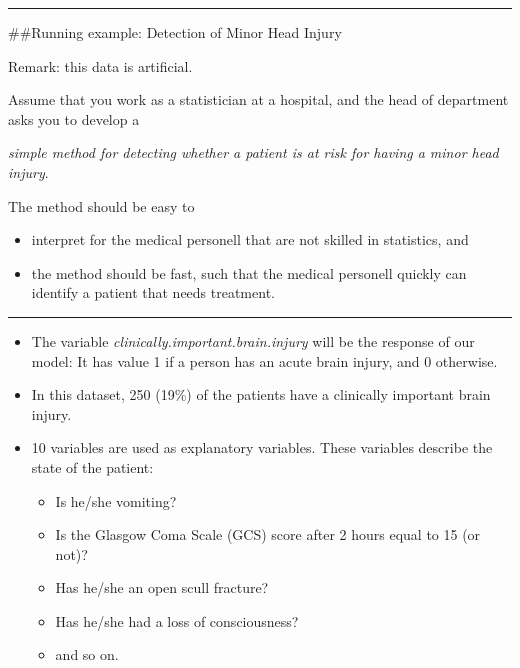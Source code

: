 \documentclass[]{article}
\providecommand{\tightlist}{%
  \setlength{\itemsep}{0pt}\setlength{\parskip}{0pt}}
\begin{document}
\begin{center}\rule{0.5\linewidth}{\linethickness}\end{center}

\#\#Running example: Detection of Minor Head Injury

Remark: this data is artificial.

Assume that you work as a statistician at a hospital, and the head of
department asks you to develop a

\emph{simple method for detecting whether a patient is at risk for
having a minor head injury}.

The method should be easy to

\begin{itemize}
\tightlist
\item
  interpret for the medical personell that are not skilled in
  statistics, and
\item
  the method should be fast, such that the medical personell quickly can
  identify a patient that needs treatment.
\end{itemize}

\begin{center}\rule{0.5\linewidth}{\linethickness}\end{center}

\begin{itemize}
\tightlist
\item
  The variable \emph{clinically.important.brain.injury} will be the
  response of our model: It has value 1 if a person has an acute brain
  injury, and 0 otherwise.
\item
  In this dataset, 250 (19\%) of the patients have a clinically
  important brain injury.
\item
  10 variables are used as explanatory variables. These variables
  describe the state of the patient:

  \begin{itemize}
  \tightlist
  \item
    Is he/she vomiting?
  \item
    Is the Glasgow Coma Scale (GCS) score after 2 hours equal to 15 (or
    not)?
  \item
    Has he/she an open scull fracture?
  \item
    Has he/she had a loss of consciousness?
  \item
    and so on.
  \end{itemize}
\end{itemize}
\end{document}
